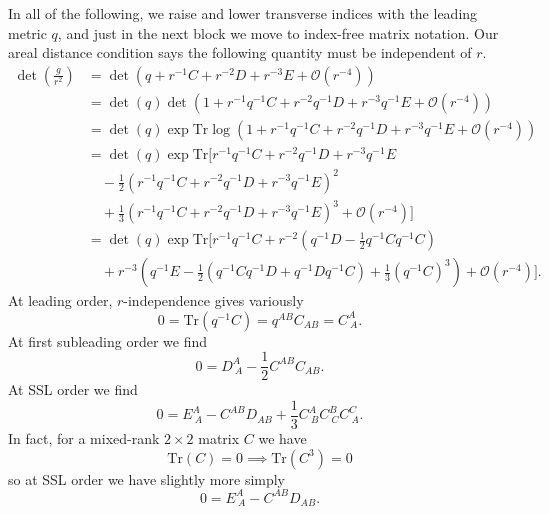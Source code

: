 \documentclass[11pt,letterpaper]{article}
\newcommand{\LP}{\left(}
\newcommand{\RP}{\right)}
\newcommand{\mc}[1]{\mathcal{#1}}
\begin{document}
In all of the following, we raise and lower transverse indices with the leading metric $q$, and just in the next block we move to index-free matrix notation. Our areal distance condition says the following quantity must be independent of $r$. \begin{equation}
\begin{aligned}
\det \LP \frac{g}{r^2} \RP & = \det \LP q + r^{-1} C + r^{-2} D + r^{-3} E + \mc{O} \LP r^{-4} \RP \RP \\
& = \det (q) \det \LP 1 + r^{-1} q^{-1} C + r^{-2} q^{-1} D + r^{-3} q^{-1} E + \mc{O} \LP r^{-4} \RP \RP \\
& = \det(q) \exp \mbox{Tr} \log \LP 1 + r^{-1} q^{-1} C + r^{-2} q^{-1} D + r^{-3} q^{-1} E + \mc{O} \LP r^{-4} \RP \RP \\
& = \det (q) \exp \mbox{Tr} \Bigg[ r^{-1} q^{-1} C + r^{-2} q^{-1} D + r^{-3} q^{-1} E \\
& \quad - \frac{1}{2} \LP r^{-1} q^{-1} C + r^{-2} q^{-1} D + r^{-3} q^{-1} E \RP ^2 \\
& \quad + \frac{1}{3} \LP r^{-1} q^{-1} C + r^{-2} q^{-1} D + r^{-3} q^{-1} E \RP^3 + \mc{O} \LP r^{-4} \RP \Bigg] \\
& = \det(q) \exp \mbox{Tr} \Bigg[ r^{-1} q^{-1} C + r^{-2} \LP q^{-1} D - \frac{1}{2} q^{-1} C q^{-1} C \RP \\
& \quad + r^{-3} \LP q^{-1} E - \frac{1}{2} \LP q^{-1} C q^{-1} D + q^{-1} D q^{-1} C \RP + \frac{1}{3} (q^{-1} C)^3 \RP + \mc{O} \LP r^{-4} \RP \Bigg].
\end{aligned}
\end{equation}
At leading order, $r$-independence gives variously \begin{equation}
0 = \mbox{Tr} \LP q^{-1} C \RP = q^{AB} C_{AB} = C^A_{ \ A}.
\end{equation}
At first subleading order we find \begin{equation}
0 = D^A_{ \ A} - \frac{1}{2} C^{AB}C_{AB}.
\end{equation}
At SSL order we find \begin{equation}
0 = E^A_{ \ A} - C^{AB}D_{AB} + \frac{1}{3} C^A_{ \ B} C^B_{ \ C} C^C_{ \ A}.
\end{equation}
In fact, for a mixed-rank $2 \times 2$ matrix $C$ we have \begin{equation}
\mbox{Tr}(C) = 0 \implies \mbox{Tr} \LP C^3 \RP = 0
\end{equation}
so at SSL order we have slightly more simply \begin{equation}
0 = E^A_{ \ A} - C^{AB}D_{AB}.
\end{equation}
\end{document}
